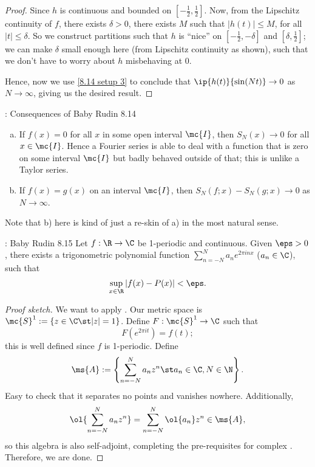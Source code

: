 \begin{proof}
    Since \(h\) is continuous and bounded on \(\displaystyle\left[-\frac{1}{2},\frac{1}{2}\right]\). Now, from the Lipschitz continuity of \(f\), there exists \(\delta>0\), there exists \(M\) such that \(|h(t)|\leq M\), for all \(|t|\leq\delta\). So we construct partitions such that \(h\) is ``nice'' on \(\displaystyle\left[-\frac{1}{2},-\delta\right]\) and \(\displaystyle\left[\delta,\frac{1}{2}\right]\); we can make \(\delta\) small enough here (from Lipschitz continuity as shown), such that we don't have to worry about \(h\) misbehaving at \(0\).

    \medskip
    
    Hence, now we use \cref{8.14 setup 3} to conclude that \(\ip{h(t)}{\sin(Nt)}\to 0\) as \(N\to\infty\), giving us the desired result.
\end{proof}

\begin{ncorollary}{: Consequences of Baby Rudin 8.14}
    \begin{enumerate}[a)]
        \item If \(f(x)=0\) for all \(x\) in some open interval \(\mc{I}\), then \(S_N(x)\to 0\) for all \(x\in\mc{I}\). Hence a Fourier series is able to deal with a function that is zero on some interval \(\mc{I}\) but badly behaved outside of that; this is unlike a Taylor series.
        
        \item If \(f(x)=g(x)\) on an interval \(\mc{I}\), then \(S_N(f;x)-S_N(g;x)\to 0\) as \(N\to\infty\).
    \end{enumerate}
\end{ncorollary}
Note that b) here is kind of just a re-skin of a) in the most natural sense.
\begin{ntheorem}{: Baby Rudin 8.15}
    Let \(f:\R\to\C\) be 1-periodic and continuous. Given \(\eps>0\), there exists a trigonometric polynomial function \(\displaystyle\sum_{n=-N}^N a_ne^{2\pi inx}\) (\(a_n\in\C\)), such that 
    \begin{equation*} 
        \sup_{x\in\R}|f(x)-P(x)|<\eps.
    \end{equation*}
\end{ntheorem}
\begin{proof}[Proof sketch]
    We want to apply \SW. Our metric space is \(\mc{S}^1:=\{z\in\C\st |z|=1\}\). Define \(F:\mc{S}^1\to\C\) such that
    \begin{equation*} 
        F(e^{2\pi it})=f(t);
    \end{equation*}
    this is well defined since \(f\) is 1-periodic. Define
    \begin{equation*} 
        \ms{A}:=\left\{\sum_{n=-N}^{N} a_nz^n\st a_n\in\C, N\in\N\right\}.
    \end{equation*}
    Easy to check that it separates no points and vanishes nowhere. Additionally, 
    \begin{equation*} 
        \ol{\sum_{n=-N}^{N} a_nz^n}=\sum_{n=-N}^{N} \ol{a_n}z^n\in\ms{A},
    \end{equation*}
    so this algebra is also self-adjoint, completing the pre-requisites for complex \SW. Therefore, we are done.
\end{proof}


